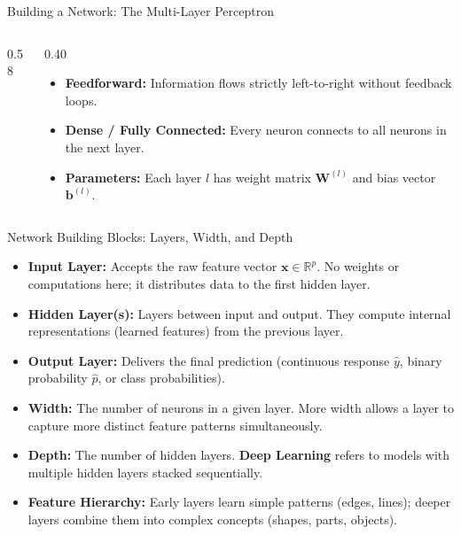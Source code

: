 \begin{frame}{Building a Network: The Multi-Layer Perceptron}
\begin{columns}[c]
\begin{column}{0.58\textwidth}
        \end{column}
        \begin{column}{0.40\textwidth}
            \small
            \begin{itemize}
                \item \textbf{Feedforward:} Information flows strictly left-to-right without feedback loops.
                \item \textbf{Dense / Fully Connected:} Every neuron connects to all neurons in the next layer.
                \item \textbf{Parameters:} Each layer $l$ has weight matrix $\mathbf{W}^{(l)}$ and bias vector $\mathbf{b}^{(l)}$.
            \end{itemize}
        \end{column}
    \end{columns}
\end{frame}

\begin{frame}{Network Building Blocks: Layers, Width, and Depth}
    \begin{itemize}
        \item \textbf{Input Layer:} Accepts the raw feature vector $\mathbf{x} \in \mathbb{R}^p$. No weights or computations here; it distributes data to the first hidden layer.
        \item \textbf{Hidden Layer(s):} Layers between input and output. They compute internal representations (learned features) from the previous layer.
        \item \textbf{Output Layer:} Delivers the final prediction (continuous response $\hat{y}$, binary probability $\hat{p}$, or class probabilities).
        \item \textbf{Width:} The number of neurons in a given layer. More width allows a layer to capture more distinct feature patterns simultaneously.
        \item \textbf{Depth:} The number of hidden layers. \textbf{Deep Learning} refers to models with multiple hidden layers stacked sequentially.
        \item \textbf{Feature Hierarchy:} Early layers learn simple patterns (edges, lines); deeper layers combine them into complex concepts (shapes, parts, objects).
    \end{itemize}
\end{frame}

